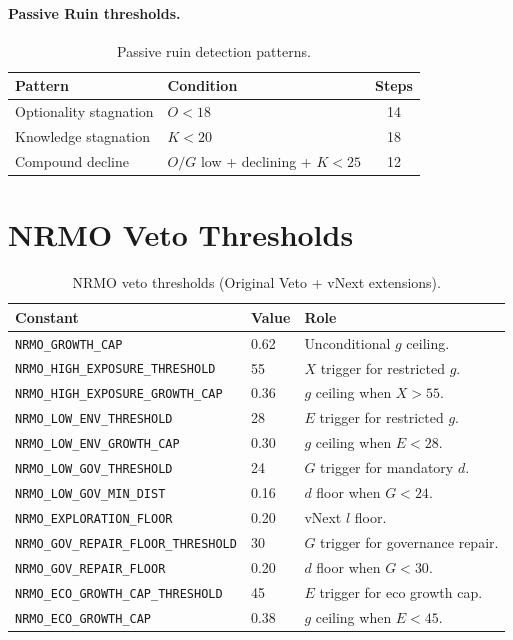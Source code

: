 \paragraph{Passive Ruin thresholds.}

\begin{table}[ht]
\centering
\small
\begin{tabularx}{\linewidth}{Xlc}
\toprule
\textbf{Pattern} & \textbf{Condition} & \textbf{Steps} \\
\midrule
Optionality stagnation & $O < 18$ & 14 \\
Knowledge stagnation & $K < 20$ & 18 \\
Compound decline & $O / G$ low + declining + $K < 25$ & 12 \\
\bottomrule
\end{tabularx}
\caption[Passive ruin thresholds]{Passive ruin detection patterns.}
\label{tab:passive-ruin}
\end{table}

\section{NRMO Veto Thresholds}
\label{sec:world-veto-thresholds}

\begin{table}[ht]
\centering
\small
\begin{tabularx}{\linewidth}{Xll}
\toprule
\textbf{Constant} & \textbf{Value} & \textbf{Role} \\
\midrule
\texttt{NRMO\_GROWTH\_CAP} & 0.62 & Unconditional $g$ ceiling. \\
\texttt{NRMO\_HIGH\_EXPOSURE\_THRESHOLD} & 55 & $X$ trigger for
restricted $g$. \\
\texttt{NRMO\_HIGH\_EXPOSURE\_GROWTH\_CAP} & 0.36 & $g$ ceiling
when $X > 55$. \\
\texttt{NRMO\_LOW\_ENV\_THRESHOLD} & 28 & $E$ trigger for
restricted $g$. \\
\texttt{NRMO\_LOW\_ENV\_GROWTH\_CAP} & 0.30 & $g$ ceiling when
$E < 28$. \\
\texttt{NRMO\_LOW\_GOV\_THRESHOLD} & 24 & $G$ trigger for
mandatory $d$. \\
\texttt{NRMO\_LOW\_GOV\_MIN\_DIST} & 0.16 & $d$ floor when
$G < 24$. \\
\texttt{NRMO\_EXPLORATION\_FLOOR} & 0.20 & vNext $l$ floor. \\
\texttt{NRMO\_GOV\_REPAIR\_FLOOR\_THRESHOLD} & 30 & $G$ trigger for
governance repair. \\
\texttt{NRMO\_GOV\_REPAIR\_FLOOR} & 0.20 & $d$ floor when
$G < 30$. \\
\texttt{NRMO\_ECO\_GROWTH\_CAP\_THRESHOLD} & 45 & $E$ trigger for
eco growth cap. \\
\texttt{NRMO\_ECO\_GROWTH\_CAP} & 0.38 & $g$ ceiling when
$E < 45$. \\
\bottomrule
\end{tabularx}
\caption[NRMO veto thresholds]{NRMO veto thresholds (Original
Veto + vNext extensions).}
\label{tab:nrmo-veto-thresholds}
\end{table}

